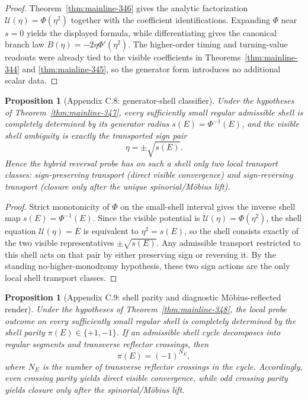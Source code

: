 \documentclass[12pt,a4paper]{article}
\newtheorem{proposition}[theorem]{Proposition}
\begin{document}
\begin{proof}
Theorem~\ref{thm:mainline-346} gives the analytic factorization $\mathcal U(\eta)=\Phi(\eta^2)$ together with the coefficient identifications. Expanding $\Phi$ near $s=0$ yields the displayed formula, while differentiating gives the canonical branch law $B(\eta)=-2\eta\Phi'(\eta^2)$. The higher-order timing and turning-value readouts were already tied to the visible coefficients in Theorems~\ref{thm:mainline-344} and \ref{thm:mainline-345}, so the generator form introduces no additional scalar data.
\end{proof}


\begin{proposition}[Appendix C.8: generator-shell classifier]
\label{prop:app-c-34-8}
Under the hypotheses of Theorem~\ref{thm:mainline-347}, every sufficiently small regular admissible shell is completely determined by its generator radius $s(E)=\Phi^{-1}(E)$, and the visible shell ambiguity is exactly the transported sign pair
\[
 \eta=\pm\sqrt{s(E)}.
\]
Hence the hybrid reversal probe has on such a shell only two local transport classes: sign-preserving transport (direct visible convergence) and sign-reversing transport (closure only after the unique spinorial/M\"obius lift).
\end{proposition}

\begin{proof}
Strict monotonicity of $\Phi$ on the small-shell interval gives the inverse shell map $s(E)=\Phi^{-1}(E)$. Since the visible potential is $\mathcal U(\eta)=\Phi(\eta^2)$, the shell equation $\mathcal U(\eta)=E$ is equivalent to $\eta^2=s(E)$, so the shell consists exactly of the two visible representatives $\pm\sqrt{s(E)}$. Any admissible transport restricted to this shell acts on that pair by either preserving sign or reversing it. By the standing no-higher-monodromy hypothesis, these two sign actions are the only local shell transport classes.
\end{proof}


\begin{proposition}[Appendix C.9: shell parity and diagnostic M\"obius-reflected render]
\label{prop:app-c-34-9}
Under the hypotheses of Theorem~\ref{thm:mainline-348}, the local probe outcome on every sufficiently small regular shell is completely determined by the shell parity $\pi(E)\in\{+1,-1\}$. If an admissible shell cycle decomposes into regular segments and transverse reflector crossings, then
\[
 \pi(E)=(-1)^{N_E},
\]
where $N_E$ is the number of transverse reflector crossings in the cycle. Accordingly, even crossing parity yields direct visible convergence, while odd crossing parity yields closure only after the spinorial/M\"obius lift.
\end{proposition}
\end{document}

